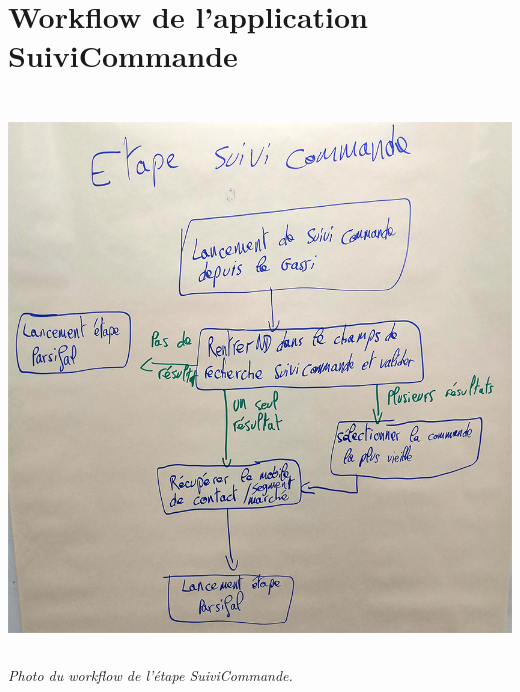 \documentclass[a4paper,twoside,12pt]{report}
\begin{document}
\chapter{Workflow de l'application SuiviCommande}
\begin{center}
\includegraphics[height=15cm]{workflowSuiviCommande.jpg}\\
\itshape Photo du workflow de l'étape SuiviCommande.
\end{center}
\end{document}
